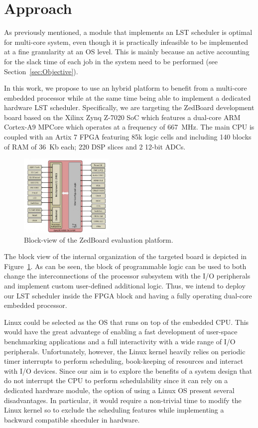\section{Approach}
\label{sec:Approach}

As previously mentioned, a module that implements an LST scheduler is
optimal for multi-core system, even though it is practically
infeasible to be implemented at a fine granularity at an OS
level. This is mainly because an active accounting for the slack time
of each job in the system need to be performed (see
Section~\ref{sec:Objective}).

In this work, we propose to use an hybrid platform to benefit from a
multi-core embedded processor while at the same time being able to
implement a dedicated hardware LST scheduler. Specifically, we are
targeting the ZedBoard development board based on the Xilinx Zynq
Z-7020 SoC which features a dual-core ARM Cortex-A9 MPCore which
operates at a frequency of 667~MHz. The main CPU is coupled with an
Artix 7 FPGA featuring 85k logic cells and including 140 blocks of RAM
of 36~Kb each; 220 DSP slices and 2 12-bit ADCs.

\begin{figure}[h]
  \centering
  \includegraphics[width=0.4\textwidth]{fig/blocks.png}
  \caption{Block-view of the ZedBoard evaluation platform.}
  \label{fig:blocks}
\end{figure}

The block view of the internal organization of the targeted board is
depicted in Figure~\ref{fig:blocks}. As can be seen, the block of
programmable logic can be used to both change the interconnections of
the processor subsystem with the I/O peripherals and implement custom
user-defined additional logic. Thus, we intend to deploy our LST
scheduler inside the FPGA block and having a fully operating dual-core
embedded processor.

Linux could be selected as the OS that runs on top of the embedded
CPU. This would have the great advantege of enabling a fast
development of user-space benchmarking applications and a full
interactivity with a wide range of I/O peripherals. Unfortunately,
however, the Linux kernel heavily relies on periodic timer interrupts
to perform scheduling, book-keeping of resources and interact with I/O
devices. Since our aim is to explore the benefits of a system design
that do not interrupt the CPU to perform schedulability since it can
rely on a dedicated hardware module, the option of using a Linux OS
present several disadvantages. In particular, it would require a
non-trivial time to modify the Linux kernel so to exclude the
scheduling features while implementing a backward compatible shceduler
in hardware. 

